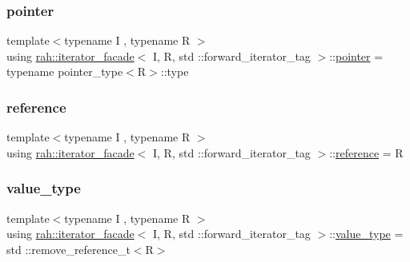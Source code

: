 \subsubsection{\texorpdfstring{pointer}{pointer}}
{\footnotesize\ttfamily template$<$typename I , typename R $>$ \\
using \mbox{\hyperlink{structrah_1_1iterator__facade}{rah\+::iterator\+\_\+facade}}$<$ I, R, std \+::forward\+\_\+iterator\+\_\+tag $>$\+::\mbox{\hyperlink{structrah_1_1iterator__facade_3_01_i_00_01_r_00_01std_01_1_1forward__iterator__tag_01_4_a341d48f3cb5b1df5da4ee7b7bc77a4c2}{pointer}} =  typename pointer\+\_\+type$<$R$>$\+::type}

\mbox{\label{structrah_1_1iterator__facade_3_01_i_00_01_r_00_01std_01_1_1forward__iterator__tag_01_4_afc82a925c7d3fa3959bc9e8fc96dc582}} 
\subsubsection{\texorpdfstring{reference}{reference}}
{\footnotesize\ttfamily template$<$typename I , typename R $>$ \\
using \mbox{\hyperlink{structrah_1_1iterator__facade}{rah\+::iterator\+\_\+facade}}$<$ I, R, std \+::forward\+\_\+iterator\+\_\+tag $>$\+::\mbox{\hyperlink{structrah_1_1iterator__facade_3_01_i_00_01_r_00_01std_01_1_1forward__iterator__tag_01_4_afc82a925c7d3fa3959bc9e8fc96dc582}{reference}} =  R}

\mbox{\label{structrah_1_1iterator__facade_3_01_i_00_01_r_00_01std_01_1_1forward__iterator__tag_01_4_a382051259e4c6ce57365cbdd02e6536e}} 
\subsubsection{\texorpdfstring{value\_type}{value\_type}}
{\footnotesize\ttfamily template$<$typename I , typename R $>$ \\
using \mbox{\hyperlink{structrah_1_1iterator__facade}{rah\+::iterator\+\_\+facade}}$<$ I, R, std \+::forward\+\_\+iterator\+\_\+tag $>$\+::\mbox{\hyperlink{structrah_1_1iterator__facade_3_01_i_00_01_r_00_01std_01_1_1forward__iterator__tag_01_4_a382051259e4c6ce57365cbdd02e6536e}{value\+\_\+type}} =  std \+::remove\+\_\+reference\+\_\+t$<$R$>$}



